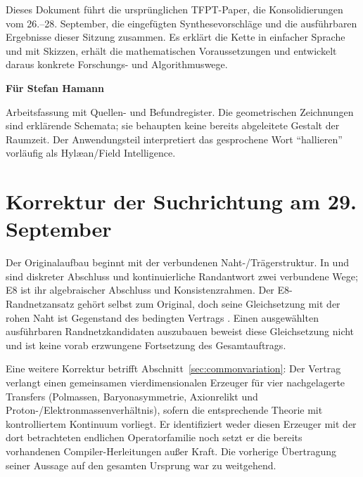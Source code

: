 \begin{titlepage}
\vspace{8mm}
Dieses Dokument führt die ursprünglichen TFPT-Paper, die Konsolidierungen vom 26.--28. September, die eingefügten Synthesevorschläge und die ausführbaren Ergebnisse dieser Sitzung zusammen. Es erklärt die Kette in einfacher Sprache und mit Skizzen, erhält die mathematischen Voraussetzungen und entwickelt daraus konkrete Forschungs- und Algorithmuswege.

\vfill
\textbf{Für Stefan Hamann}\par
Arbeitsfassung mit Quellen- und Befundregister. Die geometrischen Zeichnungen sind erklärende Schemata; sie behaupten keine bereits abgeleitete Gestalt der Raumzeit. Der Anwendungsteil interpretiert das gesprochene Wort ``hallieren'' vorläufig als Hylæan/Field Intelligence.
\end{titlepage}

\section*{Korrektur der Suchrichtung am 29. September}

Der Originalaufbau beginnt mit der verbundenen Naht-/Trägerstruktur. In
 und  sind diskreter Abschluss und kontinuierliche Randantwort zwei verbundene Wege; E8 ist ihr algebraischer Abschluss und Konsistenzrahmen. Der E8-Randnetzansatz gehört selbst zum Original, doch seine Gleichsetzung mit der rohen Naht ist Gegenstand des bedingten Vertrags . Einen ausgewählten ausführbaren Randnetzkandidaten auszubauen beweist diese Gleichsetzung nicht und ist keine vorab erzwungene Fortsetzung des Gesamtauftrags.

Eine weitere Korrektur betrifft Abschnitt~\ref{sec:commonvariation}: Der Vertrag
 verlangt einen gemeinsamen vierdimensionalen Erzeuger für vier nachgelagerte Transfers (Polmassen, Baryonasymmetrie, Axionrelikt und Proton-/Elektronmassenverhältnis), sofern die entsprechende Theorie mit kontrolliertem Kontinuum vorliegt. Er identifiziert weder diesen Erzeuger mit der dort betrachteten endlichen Operatorfamilie noch setzt er die bereits vorhandenen Compiler-Herleitungen außer Kraft. Die vorherige Übertragung seiner Aussage auf den gesamten Ursprung war zu weitgehend.

